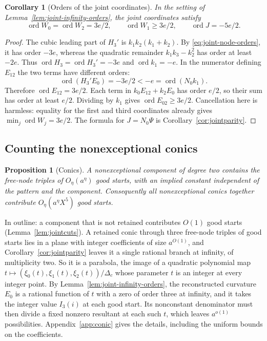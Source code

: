 \documentclass[11pt]{article}
\newtheorem{proposition}[theorem]{Proposition}
\newtheorem{corollary}[theorem]{Corollary}
\theoremstyle{definition}
\theoremstyle{remark}
\begin{document}
\begin{corollary}[Orders of the joint coordinates]\label{cor:joint-curvature-orders}
In the setting of Lemma~\ref{lem:joint-infinity-orders}, the joint
coordinates satisfy
\begin{equation}\label{eq:jointorders}
 \operatorname{ord}W_0=\operatorname{ord}W_2=3e/2,\qquad
 \operatorname{ord}W_1\ge3e/2,\qquad
 \operatorname{ord}J=-5e/2.
\end{equation}
\end{corollary}
\begin{proof}
The cubic leading part of $H_3'$ is $k_1k_2(k_1+k_2)$.
By \eqref{eq:joint-node-orders}, it has order $-3e$, whereas the
quadratic remainder $k_1k_3-k_2^2$ has order at least $-2e$.
Thus $\operatorname{ord}H_3=\operatorname{ord}H_3'=-3e$ and
$\operatorname{ord}k_1=-e$.
In the numerator defining $E_{12}$ the two terms have different orders:
\[
 \operatorname{ord}(H_3'E_0)=-3e/2
       <-e=\operatorname{ord}(N_0k_1).
\]
Therefore $\operatorname{ord}E_{12}=3e/2$.
Each term in $k_0E_{12}+k_2E_0$ has order $e/2$, so their sum has
order at least $e/2$. Dividing by $k_1$ gives
$\operatorname{ord}E_{02}\ge3e/2$. Cancellation here is harmless:
equality for the first and third coordinates already gives
$\min_j\operatorname{ord}W_j=3e/2$.
The formula for $J=N_0\Psi$ is Corollary~\ref{cor:jointparity}.
\end{proof}

\subsection{Counting the nonexceptional conics}\label{sec:jointconic}

\begin{proposition}[Conics]\label{prop:jointconic}
A nonexceptional component of degree two contains the free-node triples of $O_\eta(a^\eta)$
good starts, with an implied constant independent of the pattern and the component.
Consequently all nonexceptional conics together contribute $O_\eta(a^\eta X^5)$ good starts.
\end{proposition}

In outline: a component that is not retained contributes $O(1)$ good starts
(Lemma~\ref{lem:jointcuts}). A retained conic through three free-node triples of good starts
lies in a plane with integer coefficients of size $a^{O(1)}$, and Corollary~\ref{cor:jointparity} leaves it a single rational branch at
infinity, of multiplicity two. So it is a parabola, the image of a quadratic polynomial map
$t\mapsto(\xi_0(t),\xi_1(t),\xi_2(t))/\Delta_c$ whose parameter $t$ is an integer at every
integer point. By Lemma~\ref{lem:joint-infinity-orders}, the reconstructed curvature $E_0$ is
a rational function of $t$ with a zero of order three at infinity, and it takes the integer
value $I_3(i)$ at each good start. Its nonconstant denominator must then divide a fixed nonzero
resultant at each such $t$, which leaves $a^{o(1)}$ possibilities. Appendix~\ref{app:conic}
gives the details, including the uniform bounds on the coefficients.
\end{document}
